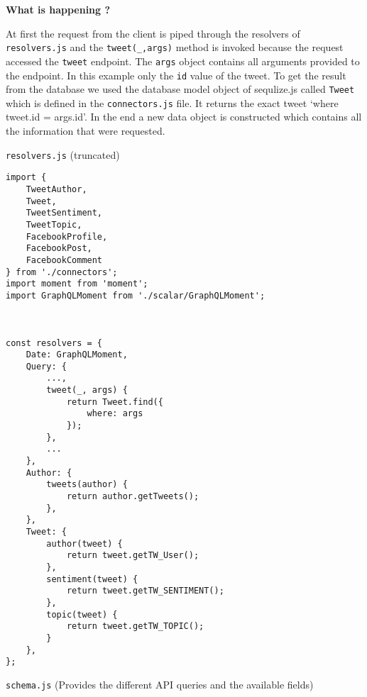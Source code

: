 \documentclass[]{article}
\begin{document}
\textbf{What is happening ?}

At first the request from the client is piped through the resolvers of
\texttt{resolvers.js} and the \texttt{tweet(\_,args)} method is invoked
because the request accessed the \texttt{tweet} endpoint. The
\texttt{args} object contains all arguments provided to the endpoint. In
this example only the \texttt{id} value of the tweet. To get the result
from the database we used the database model object of sequlize.js
called \texttt{Tweet} which is defined in the \texttt{connectors.js}
file. It returns the exact tweet `where tweet.id = args.id'. In the end
a new data object is constructed which contains all the information that
were requested.

\texttt{resolvers.js} (truncated)

\begin{verbatim}
import {
    TweetAuthor,
    Tweet,
    TweetSentiment,
    TweetTopic,
    FacebookProfile,
    FacebookPost,
    FacebookComment
} from './connectors';
import moment from 'moment';
import GraphQLMoment from './scalar/GraphQLMoment';



const resolvers = {
    Date: GraphQLMoment,
    Query: {
        ...,
        tweet(_, args) {
            return Tweet.find({
                where: args
            });
        },
        ...
    },
    Author: {
        tweets(author) {
            return author.getTweets();
        },
    },
    Tweet: {
        author(tweet) {
            return tweet.getTW_User();
        },
        sentiment(tweet) {
            return tweet.getTW_SENTIMENT();
        },
        topic(tweet) {
            return tweet.getTW_TOPIC();
        }
    },
};
\end{verbatim}

\texttt{schema.js} (Provides the different API queries and the available
fields)
\end{document}
